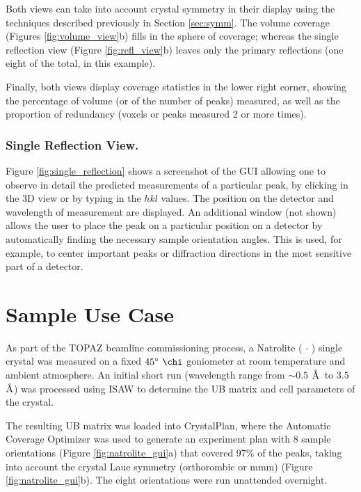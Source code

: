 \documentclass[final]{iucr}              %
\newcommand{\ang}{$\mathrm{\AA} $}
\begin{document}
Both views can take into account crystal symmetry in their display using the
techniques described previously in Section \ref{sec:symm}.
The volume coverage (Figures \ref{fig:volume_view}b) fills in the sphere of
coverage; 
whereas the single reflection view (Figure \ref{fig:refl_view}b) leaves only
the primary reflections (one eight of the total, in this example).
 
Finally, both views display coverage statistics in the lower right
corner, showing the percentage of volume (or of the number of peaks) measured,
as well as the proportion of redundancy (voxels or peaks measured 2 or more
times). 

\subsubsection{Single Reflection View.}
Figure \ref{fig:single_reflection} shows a screenshot of the GUI allowing one to
observe in detail the predicted measurements of a particular peak, by clicking
in the 3D view or by typing in the $hkl$ values. The position on the detector
and wavelength of measurement are displayed. An additional window (not shown) allows the user to place the peak on a particular
position on a detector by automatically finding the necessary sample orientation
angles. This is used, for example, to center important peaks or diffraction
directions in the most sensitive part of a detector.



\section{Sample Use Case}

As part of the TOPAZ beamline commissioning process, a Natrolite
( $\cdot$ ) single crystal was measured on a fixed
$45\degree\ \chi$ goniometer at room temperature and ambient atmosphere. An
initial short run (wavelength range from $\sim0.5$ \ang\ to $3.5$ \ang)
was processed using ISAW to determine the UB matrix and cell parameters of the crystal.

The resulting UB matrix was loaded into CrystalPlan, where the Automatic
Coverage Optimizer was used to generate an experiment plan with 8 sample
orientations (Figure \ref{fig:natrolite_gui}a) that covered 97\% of the peaks,
taking into account the crystal Laue symmetry (orthorombic or mmm) (Figure
\ref{fig:natrolite_gui}b). The eight orientations were run
unattended overnight.
\end{document}
